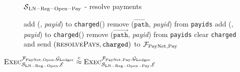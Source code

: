 \begin{figure}[H]
\begin{simulatorbox}{$\mathcal{S}{}_{\mathrm{LN - Reg - Open - Pay}}$ - resolve
  payments}
\begin{algorithmic}[1]
              \State add (\alice, \textit{payid}) to \texttt{charged}(\alice)
              \State remove ($\overrightarrow{\mathtt{path}}$, \textit{payid})
              from \texttt{payids}
             
              \State add (\alice, \textit{payid}) to \texttt{charged}(\alice)
              \State remove ($\overrightarrow{\mathtt{path}}$, \textit{payid})
              from \texttt{payids}
            \EndIf
          \EndFor
        \EndFor
        \State clear \texttt{charged} and send $\left(\textsc{resolvePays},
        \mathtt{charged}\right)$ to $\mathcal{F}_{\mathrm{PayNet}}{}_{\mathrm{, Pay}}$
      \EndIndent
    \end{algorithmic}
  \end{simulatorbox}
  \caption{}
  \label{alg:sim:resolvepay}
\end{figure}

\begin{lemma}
  \label{lemma:pay}
  $\textsc{Exec}^{\mathcal{F}_{\mathrm{PayNet}}{}_{\mathrm{, Open}}, \mathcal{G}_{\mathrm{Ledger}}}_{\mathcal{S}_{\mathrm{LN
  - Reg - Open}}, \mathcal{E}} \overset{c}{\approx}
  \textsc{Exec}^{\mathcal{F}_{\mathrm{PayNet}}{}_{\mathrm{, Pay}}, \mathcal{G}_{\mathrm{Ledger}}}_{\mathcal{S}_{\mathrm{LN -
  Reg - Open - Pay}}, \mathcal{E}}$
\end{lemma}

